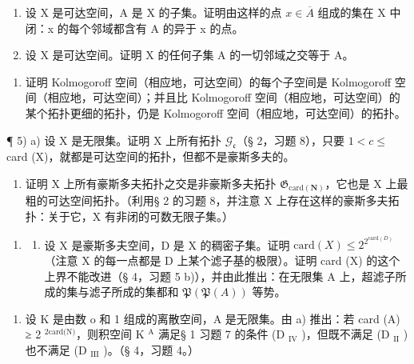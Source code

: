 \begin{enumerate}
\def\labelenumi{\alph{enumi})}
\setcounter{enumi}{1}
\item
  设 X 是可达空间，A 是 X 的子集。证明由这样的点 \(x \in \overline{A}\) 组成的集在 X 中闭：x 的每个邻域都含有 A 的异于 x 的点。
\item
  设 X 是可达空间。证明 X 的任何子集 A 的一切邻域之交等于 A。
\end{enumerate}

\begin{enumerate}
\def\labelenumi{\arabic{enumi})}
\setcounter{enumi}{3}
\tightlist
\item
  证明 Kolmogoroff 空间（相应地，可达空间）的每个子空间是 Kolmogoroff 空间（相应地，可达空间）；并且比 Kolmogoroff 空间（相应地，可达空间）的某个拓扑更细的拓扑，仍是 Kolmogoroff 空间（相应地，可达空间）的拓扑。
\end{enumerate}

¶ 5) a) 设 X 是无限集。证明 X 上所有拓扑 \(\mathcal{G}_{\mathfrak{c}}\)（§ 2，习题 8），只要 \(1 < c \leqslant\) card (X)，就都是可达空间的拓扑，但都不是豪斯多夫的。

\begin{enumerate}
\def\labelenumi{\alph{enumi})}
\setcounter{enumi}{1}
\tightlist
\item
  证明 X 上所有豪斯多夫拓扑之交是非豪斯多夫拓扑 \(\mathfrak{G}_{\mathrm{card}(\mathbf{N})}\)，它也是 X 上最粗的可达空间拓扑。（利用§ 2 的习题 8，并注意 X 上存在这样的豪斯多夫拓扑：关于它，X 有非闭的可数无限子集。）
\end{enumerate}

\begin{enumerate}
\def\labelenumi{\arabic{enumi})}
\setcounter{enumi}{5}
\tightlist
\item
  \begin{enumerate}
  \def\labelenumii{\alph{enumii})}
  \tightlist
  \item
    设 X 是豪斯多夫空间，D 是 X 的稠密子集。证明 \(\text{card}(X) \leqslant 2^{2^{\text{card}(D)}}\)（注意 X 的每一点都是 D 上某个滤子基的极限）。证明 card (X) 的这个上界不能改进（§ 4，习题 5 b)），并由此推出：在无限集 A 上，超滤子所成的集与滤子所成的集都和 \(\mathfrak{P}(\mathfrak{P}(A))\) 等势。
  \end{enumerate}
\end{enumerate}

\begin{enumerate}
\def\labelenumi{\alph{enumi})}
\setcounter{enumi}{1}
\tightlist
\item
  设 K 是由数 o 和 1 组成的离散空间，A 是无限集。由 a) 推出：若 card (A) ≥ 2 \(^{2\text{card(N)}}\)，则积空间 K \(^{\text{A}}\) 满足§ 1 习题 7 的条件 (D \(_{\text{IV}}\) )，但既不满足 (D \(_{\text{II}}\) ) 也不满足 (D \(_{\text{III}}\) )。（§ 4，习题 4。）
\end{enumerate}

